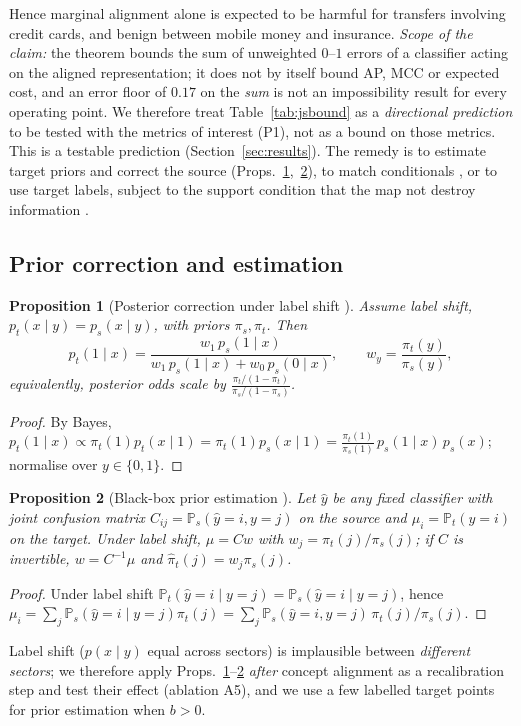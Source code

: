 \documentclass[journal]{IEEEtran}
\newtheorem{proposition}{Proposition}
\newcommand{\Prob}{\mathbb{P}}
\newcommand{\1}{\mathbf{1}}
\begin{document}
Hence marginal alignment alone is expected to be harmful for transfers involving credit cards, and benign between mobile money and insurance. \emph{Scope of the claim:} the theorem bounds the sum of unweighted $0$--$1$ errors of a classifier acting on the aligned representation; it does not by itself bound AP, MCC or expected cost, and an error floor of $0.17$ on the \emph{sum} is not an impossibility result for every operating point. We therefore treat Table~\ref{tab:jsbound} as a \emph{directional prediction} to be tested with the metrics of interest (P1), not as a bound on those metrics. This is a testable prediction (Section~\ref{sec:results}). The remedy is to estimate target priors and correct the source (Props.~\ref{prop:saerens},~\ref{prop:bbse}), to match conditionals \cite{tachet2020gls,zhang2013target}, or to use target labels, subject to the support condition that the map not destroy information \cite{johansson2019support}.

\subsection{Prior correction and estimation}
\begin{proposition}[Posterior correction under label shift \cite{saerens2002adjusting}]\label{prop:saerens}
Assume label shift, $p_t(x\mid y)=p_s(x\mid y)$, with priors $\pi_s,\pi_t$. Then
\begin{equation}
p_t(1\mid x)=\frac{w_1\,p_s(1\mid x)}{w_1\,p_s(1\mid x)+w_0\,p_s(0\mid x)},\qquad w_y=\frac{\pi_t(y)}{\pi_s(y)},
\end{equation}
equivalently, posterior odds scale by $\frac{\pi_t/(1-\pi_t)}{\pi_s/(1-\pi_s)}$.
\end{proposition}
\begin{proof}
By Bayes, $p_t(1\mid x)\propto\pi_t(1)p_t(x\mid1)=\pi_t(1)p_s(x\mid1)=\frac{\pi_t(1)}{\pi_s(1)}\,p_s(1\mid x)\,p_s(x)$; normalise over $y\in\{0,1\}$. \end{proof}

\begin{proposition}[Black-box prior estimation \cite{lipton2018bbse}]\label{prop:bbse}
Let $\hat y$ be any fixed classifier with joint confusion matrix $C_{ij}=\Prob_s(\hat y{=}i,y{=}j)$ on the source and $\mu_i=\Prob_t(\hat y{=}i)$ on the target. Under label shift, $\mu=Cw$ with $w_j=\pi_t(j)/\pi_s(j)$; if $C$ is invertible, $w=C^{-1}\mu$ and $\hat\pi_t(j)=w_j\pi_s(j)$.
\end{proposition}
\begin{proof}
Under label shift $\Prob_t(\hat y{=}i\mid y{=}j)=\Prob_s(\hat y{=}i\mid y{=}j)$, hence $\mu_i=\sum_j\Prob_s(\hat y{=}i\mid y{=}j)\pi_t(j)=\sum_j\Prob_s(\hat y{=}i,y{=}j)\,\pi_t(j)/\pi_s(j)$. \end{proof}
\noindent Label shift ($p(x\mid y)$ equal across sectors) is implausible between \emph{different sectors}; we therefore apply Props.~\ref{prop:saerens}--\ref{prop:bbse} \emph{after} concept alignment as a recalibration step and test their effect (ablation A5), and we use a few labelled target points for prior estimation when $b>0$.
\end{document}
